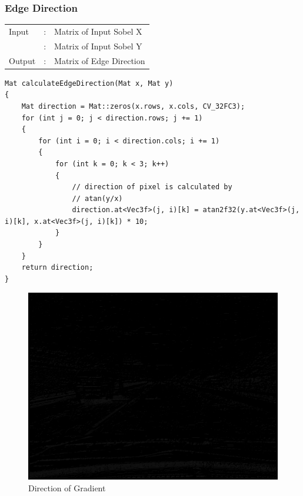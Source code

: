 \documentclass[12pt,a4paper]{report}
\begin{document}
\subsubsection{Edge Direction}
\begin{tabular}{lll}
  Input  & : & Matrix of Input Sobel X  \\
         & : & Matrix of Input Sobel Y  \\
  Output & : & Matrix of Edge Direction \\
\end{tabular}
\begin{lstlisting}
Mat calculateEdgeDirection(Mat x, Mat y)
{
    Mat direction = Mat::zeros(x.rows, x.cols, CV_32FC3);
    for (int j = 0; j < direction.rows; j += 1)
    {
        for (int i = 0; i < direction.cols; i += 1)
        {
            for (int k = 0; k < 3; k++)
            {
                // direction of pixel is calculated by
                // atan(y/x)
                direction.at<Vec3f>(j, i)[k] = atan2f32(y.at<Vec3f>(j, i)[k], x.at<Vec3f>(j, i)[k]) * 10;
            }
        }
    }
    return direction;
}
\end{lstlisting}
\begin{figure}[!htb]
  \centering
  \includegraphics[height=0.4\paperheight]{output/img2_q2_EDGE_DIR.png}
  \caption{Direction of Gradient}
\end{figure}
\clearpage
\end{document}
